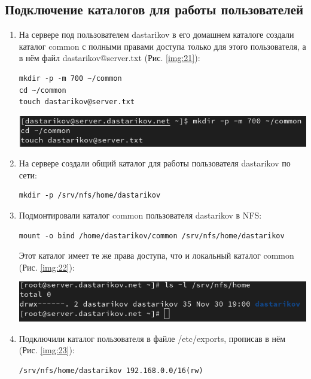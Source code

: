 \subsection{Подключение каталогов для работы пользователей}
\begin{enumerate}
\item На сервере под пользователем dastarikov в его домашнем каталоге создали каталог common с полными правами доступа только для этого пользователя, а в нём файл dastarikov@server.txt (Рис. \ref{img:21}):
    \begin{verbatim}
mkdir -p -m 700 ~/common
cd ~/common
touch dastarikov@server.txt
    \end{verbatim}

\begin{center}
    \centering
    \includegraphics[width=\textwidth]{../images/image21.png}
    \label{img:21}
\end{center}

\item На сервере создали общий каталог для работы пользователя dastarikov по сети:
    \begin{verbatim}
mkdir -p /srv/nfs/home/dastarikov
    \end{verbatim}
\item Подмонтировали каталог common пользователя dastarikov в NFS:
    \begin{verbatim}
mount -o bind /home/dastarikov/common /srv/nfs/home/dastarikov
    \end{verbatim}
    Этот каталог имеет те же права доступа, что и локальный каталог common  (Рис. \ref{img:22}):

\begin{center}
    \centering
    \includegraphics[width=\textwidth]{../images/image22.png}
    \label{img:22}
\end{center}

\item Подключили каталог пользователя в файле /etc/exports, прописав в нём (Рис. \ref{img:23}):
    \begin{verbatim}
/srv/nfs/home/dastarikov 192.168.0.0/16(rw)
    \end{verbatim}


\end{enumerate}
